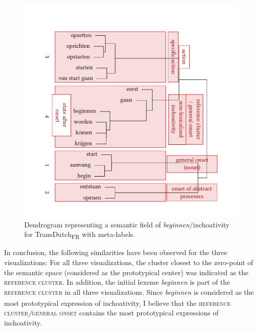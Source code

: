 \begin{figure}
\includegraphics[width=\textwidth]{figures/tree86.pdf}
\caption{\label{fig:4:83}  Dendrogram representing a semantic field of \textit{beginnen}/inchoativity for TransDutch\textsubscript{FR} with meta-labels.}
\end{figure}

In conclusion, the following similarities have been observed for the three visualizations: For all three visualizations, the cluster closest to the zero-point of the semantic space (considered as the prototypical center) was indicated as the \textsc{reference cluster}. In addition, the initial lexeme \textit{beginnen} is part of the \textsc{reference cluster} in all three visualizations.\textsubscript{} Since \textit{beginnen} is considered as the most prototypical expression of inchoativity, I believe that the \textsc{reference cluster}\textit{/}\textsc{general onset} contains the most prototypical expressions of inchoativity. 


